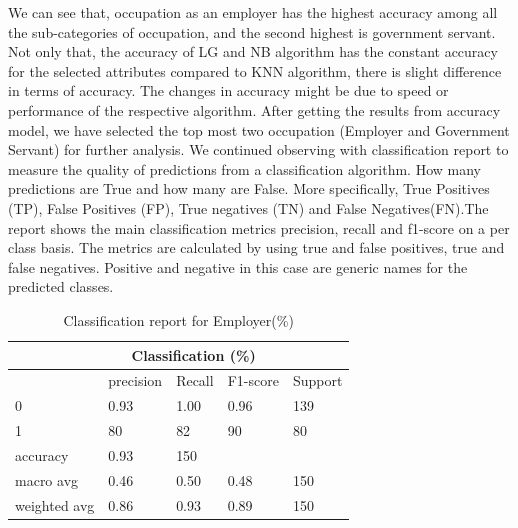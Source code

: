 \documentclass[11pt]{article}
\begin{document}
\hspace{0.5cm}  We can see that, occupation as an employer has the highest accuracy among all the sub-categories of occupation, and the second highest is government servant. Not only that, the accuracy of LG and NB algorithm has the constant accuracy for the selected attributes compared to KNN algorithm, there is slight difference in terms of accuracy. The changes in accuracy might be due to speed or performance of the respective algorithm. After getting the results from accuracy model, we have selected the top most two occupation (Employer and Government Servant) for further analysis. We continued observing with classification report to measure the quality of predictions from a classification algorithm. How many predictions are True and how many are False. More specifically, True Positives (TP), False Positives (FP), True negatives (TN) and False Negatives(FN).The report shows the main classification metrics precision, recall and f1-score on a per class basis. The metrics are calculated by using true and false positives, true and false negatives. Positive and negative in this case are generic names for the predicted classes.


\begin{table}[H]
\centering
\caption{Classification report for Employer(\%)}
\label{Classification report for Employer(\%)}
\begin{tabular}{p{3cm}p{2cm}p{2cm}p{2cm}p{2cm}}
\hline
            & \multicolumn{3}{c}{Classification (\%)}           \\ \hline
             & precision & Recall    & F1-score & Support       \\ \hline
0            & 0.93      & 1.00      & 0.96    & 139            \\ 
1            & 80        & 82        & 90      & 80             \\ \hline 
accuracy                             & 0.93    & 150            \\ \hline 
macro avg    & 0.46      & 0.50      & 0.48    & 150            \\ \hline 
weighted avg & 0.86      & 0.93      & 0.89    & 150            \\ \hline 
\end{tabular}
\end{table}
\end{document}
